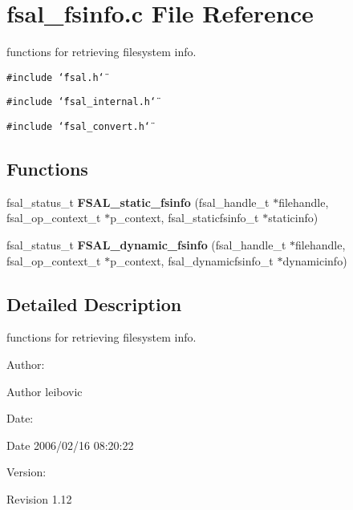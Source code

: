 \section{fsal\_\-fsinfo.c File Reference}
\label{fsal__fsinfo_8c}
functions for retrieving filesystem info.  


{\tt \#include \char`\"{}fsal.h\char`\"{}}\par
{\tt \#include \char`\"{}fsal\_\-internal.h\char`\"{}}\par
{\tt \#include \char`\"{}fsal\_\-convert.h\char`\"{}}\par
\subsection*{Functions}
\begin{CompactItemize}
\item 
fsal\_\-status\_\-t {\bf FSAL\_\-static\_\-fsinfo} (fsal\_\-handle\_\-t $\ast$filehandle, fsal\_\-op\_\-context\_\-t $\ast$p\_\-context, fsal\_\-staticfsinfo\_\-t $\ast$staticinfo)
\item 
fsal\_\-status\_\-t {\bf FSAL\_\-dynamic\_\-fsinfo} (fsal\_\-handle\_\-t $\ast$filehandle, fsal\_\-op\_\-context\_\-t $\ast$p\_\-context, fsal\_\-dynamicfsinfo\_\-t $\ast$dynamicinfo)
\end{CompactItemize}


\subsection{Detailed Description}
functions for retrieving filesystem info. 

\begin{Desc}
\item[Author:]\end{Desc}
\begin{Desc}
\item[Author]leibovic \end{Desc}
\begin{Desc}
\item[Date:]\end{Desc}
\begin{Desc}
\item[Date]2006/02/16 08:20:22 \end{Desc}
\begin{Desc}
\item[Version:]\end{Desc}
\begin{Desc}
\item[Revision]1.12 \end{Desc}



